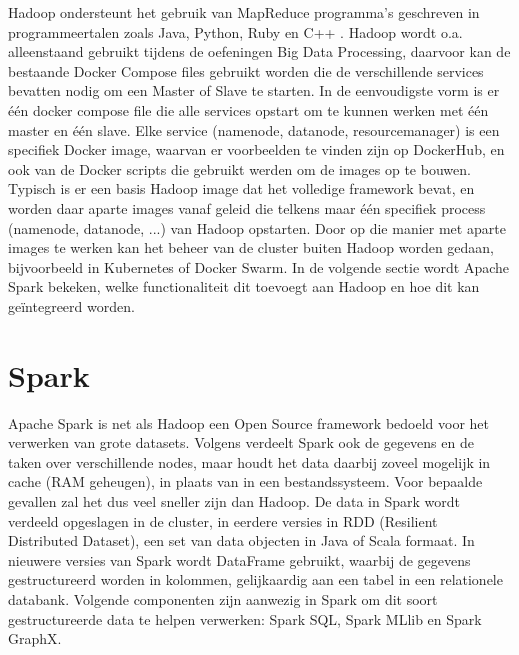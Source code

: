 Hadoop ondersteunt het gebruik van MapReduce programma's geschreven in programmeertalen zoals Java, Python, Ruby en C++ 
\autocite{Taylor2023}.
\newline
\newline
Hadoop wordt o.a. alleenstaand gebruikt tijdens de oefeningen Big Data Processing, daarvoor kan de bestaande Docker Compose files gebruikt worden die de verschillende services bevatten nodig om een Master of Slave te starten.
In de eenvoudigste vorm is er \'e\'en docker compose file die alle services opstart om te kunnen werken met \'e\'en master en \'e\'en slave.
\newline
\newline
Elke service (namenode, datanode, resourcemanager) is een specifiek Docker image, waarvan er voorbeelden te vinden zijn op DockerHub, en ook van de Docker scripts die gebruikt werden om de images op te bouwen. Typisch is er een basis Hadoop image dat het volledige framework bevat, en worden daar aparte images vanaf geleid die telkens maar \'e\'en specifiek process (namenode, datanode, ...) van Hadoop opstarten.
\newline
Door op die manier met aparte images te werken kan het beheer van de cluster buiten Hadoop worden gedaan, bijvoorbeeld in Kubernetes of Docker Swarm.
\newline
\newline
In de volgende sectie wordt Apache Spark bekeken, welke functionaliteit dit toevoegt aan Hadoop en hoe dit kan geïntegreerd worden.

\section{Spark}
Apache Spark is net als Hadoop een Open Source framework bedoeld voor het verwerken van grote datasets. Volgens \textcite{AwsAmazon2023a} verdeelt Spark ook de gegevens en de taken over verschillende nodes, maar houdt het data daarbij zoveel mogelijk in cache (RAM geheugen), in plaats van in een bestandssysteem. Voor bepaalde gevallen zal het dus veel sneller zijn dan Hadoop.
\newline
\newline
De data in Spark wordt verdeeld opgeslagen in de cluster, in eerdere versies in RDD (Resilient Distributed Dataset), een set van data objecten in Java of Scala formaat. In nieuwere versies van Spark wordt DataFrame gebruikt, waarbij de gegevens gestructureerd worden in kolommen, gelijkaardig aan een tabel in een relationele databank. Volgende componenten zijn aanwezig in Spark om dit soort gestructureerde data te helpen verwerken: Spark SQL, Spark MLlib en Spark GraphX.
\autocite{DataFlair2023}

